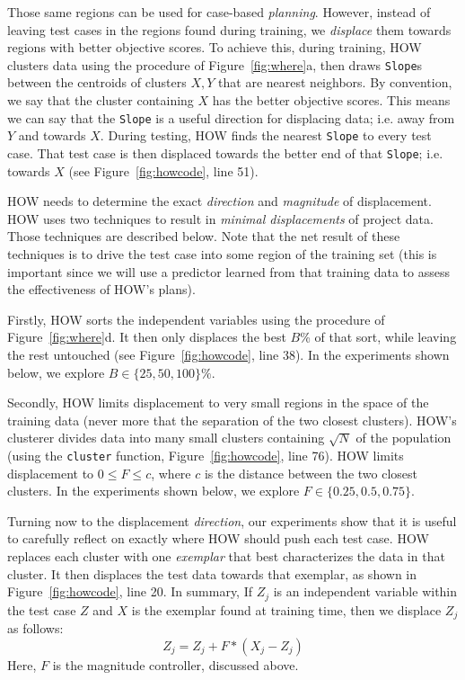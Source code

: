 \documentclass[conference]{IEEEtran}
\newcommand{\fig}[1]{Figure~\ref{fig:#1}}
\begin{document}




Those same regions can be used for case-based 
{\em planning}. However,  instead of leaving test cases in the regions
found during training, we {\em displace} them towards regions
with better objective scores.
To achieve this, 
during training, HOW clusters data using the procedure of \fig{where}a,
then draws {\tt Slope}s between the centroids of  clusters $X,Y$ that are nearest
neighbors.
By convention, we say that the cluster containing $X$ has the  better objective scores. This means we can say that the {\tt Slope} is a useful direction for displacing
data; i.e.  away from $Y$ and towards $X$. 
 During testing,  HOW   finds the  nearest {\tt Slope} to every test case. That  test case is   then displaced towards the better end
of that {\tt Slope}; i.e. towards  $X$ (see \fig{howcode}, line 51).

 HOW needs to  determine the  exact {\em direction} and {\em magnitude} of 
displacement.   
HOW uses two techniques to result in 
{\em minimal displacements} of project data. Those techniques are described below. Note
 that the net result of these techniques is to drive the test case into some region of the training 
 set (this is important since we will use a predictor learned from that training data to assess
 the effectiveness of HOW's plans).
 
 Firstly,
HOW sorts  the independent variables
using the procedure of  \fig{where}d. It then only
displaces the    best $B$\%  of that sort, while leaving the rest untouched
(see \fig{howcode}, line 38).
In  the experiments shown below,  we explore   \mbox{$B \in \{25,50,100\}\%$}.

Secondly, HOW   limits displacement
to very small regions in the space of the training data (never more that the separation
of the two closest clusters).  HOW's clusterer divides  data into many   small clusters containing
$\sqrt{N}$ of the population (using the {\tt cluster} function, \fig{howcode}, line 76).
HOW   limits displacement to  \mbox{$0 \le F \le c$}, where
$c$ is the distance between the two closest clusters. 
In  the experiments shown below,  we explore
\mbox{$F\in \{0.25, 0.5, 0.75\}$}.

Turning now to the displacement {\em direction},
our experiments show that it is useful to  carefully reflect on exactly where HOW should  push each test case.
HOW replaces each cluster   with one {\em exemplar} that best
characterizes the data in that cluster. It then displaces the
test data towards that exemplar, as shown in \fig{howcode}, line 20. In summary, 
If  $Z_j$ is an independent variable within the
test case $Z$ and  $X$ is the exemplar found at training time,
then we displace $Z_j$ as follows:
\[Z_j =  Z_j + F*(X_j - Z_j)\]
Here, $F$ is the  magnitude controller, discussed above. 
\end{document}
